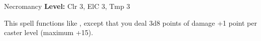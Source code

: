 {Necromancy}
{
	\textbf{Level:}
	Clr 3, ElC 3, Tmp 3\\
}
{
	This spell functions like , except that you deal 3d8 points of damage +1 point per caster level (maximum +15).

}

